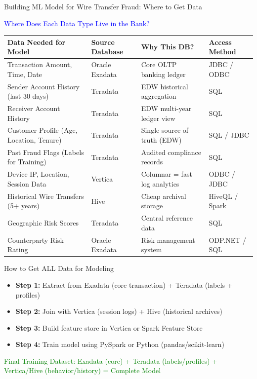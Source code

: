 \documentclass{beamer}
\begin{document}
	
	
	
\begin{frame}{Building ML Model for Wire Transfer Fraud: Where to Get Data}
	\begin{center}
		\textcolor{blue}{\large Where Does Each Data Type Live in the Bank?}
	\end{center}
	
	\begin{table}
		\tiny
		\begin{tabular}{|p{}|p{}|p{}|p{}|}
			\hline
			\textbf{Data Needed for Model} & \textbf{Source Database} & \textbf{Why This DB?} & \textbf{Access Method} \\
			\hline
			Transaction Amount, Time, Date & Oracle Exadata & Core OLTP banking ledger & JDBC / ODBC \\
			\hline
			Sender Account History (last 30 days) & Teradata & EDW historical aggregation & SQL \\
			\hline
			Receiver Account History & Teradata & EDW multi-year ledger view & SQL \\
			\hline
			Customer Profile (Age, Location, Tenure) & Teradata & Single source of truth (EDW) & SQL / JDBC \\
			\hline
			Past Fraud Flags (Labels for Training) & Teradata & Audited compliance records & SQL \\
			\hline
			Device IP, Location, Session Data & Vertica & Columnar = fast log analytics & ODBC / JDBC \\
			\hline
			Historical Wire Transfers (5+ years) & Hive & Cheap archival storage & HiveQL / Spark \\
			\hline
			Geographic Risk Scores & Teradata & Central reference data & SQL \\
			\hline
			Counterparty Risk Rating & Oracle Exadata & Risk management system & ODP.NET / SQL \\
			\hline
		\end{tabular}
	\end{table}
	
	\begin{alertblock}{How to Get ALL Data for Modeling}
		\begin{itemize}
			\tiny
			\item \textbf{Step 1:} Extract from Exadata (core transaction) + Teradata (labels + profiles)
			\item \textbf{Step 2:} Join with Vertica (session logs) + Hive (historical archives)
			\item \textbf{Step 3:} Build feature store in Vertica or Spark Feature Store
			\item \textbf{Step 4:} Train model using PySpark or Python (pandas/scikit-learn)
		\end{itemize}
	\end{alertblock}
	
	\begin{center}
		\textcolor{green}{\tiny Final Training Dataset: Exadata (core) + Teradata (labels/profiles) + Vertica/Hive (behavior/history) = Complete Model}
	\end{center}
\end{frame}
\end{document}

